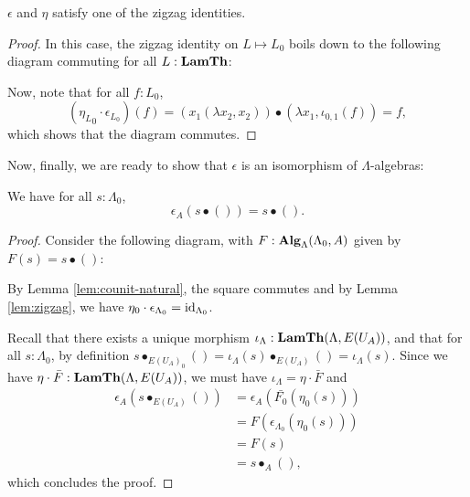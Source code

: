 \begin{lemma}\label{lem:zigzag}
  $ \epsilon $ and $ \eta $ satisfy one of the zigzag identities.
\end{lemma}
\begin{proof}
  In this case, the zigzag identity on $ L \mapsto L_0 $ boils down to the following diagram commuting for all $ L : \mathbf{LamTh} $:
  \begin{center}
  \end{center}
  Now, note that for all $ f : L_0 $,
  \[
    ({\eta_L}_0 \cdot \epsilon_{L_0})(f)
    = (x_1 (\lambda x_2, x_2)) \bullet (\lambda x_1, \iota_{0, 1}(f))
    = f,
  \]
  which shows that the diagram commutes.
\end{proof}

Now, finally, we are ready to show that $ \epsilon $ is an isomorphism of $ \Lambda $-algebras:
\begin{lemma}
  We have for all $ s: \Lambda_0 $,
  \[ \epsilon_A(s \bullet ()) = s \bullet (). \]
\end{lemma}
\begin{proof}
  Consider the following diagram, with $ F: \mathbf{Alg}_{\Lambda}(\Lambda_0, A) $ given by $ F(s) = s \bullet () $:
  \begin{center}
  \end{center}
  By Lemma \ref{lem:counit-natural}, the square commutes and by Lemma \ref{lem:zigzag}, we have $ \eta_0 \cdot \epsilon_{\Lambda_0} = \text{id}_{\Lambda_0} $.

  Recall that there exists a unique morphism $ \iota_\Lambda: \mathbf{LamTh}(\Lambda, E(U_A)) $, and that for all $ s: \Lambda_0 $, by definition $ s \bullet_{E(U_A)_0} () = \iota_\Lambda(s) \bullet_{E(U_A)} () = \iota_\Lambda(s) $. Since we have $ \eta \cdot \bar F : \mathbf{LamTh}(\Lambda, E(U_A)) $, we must have $ \iota_\Lambda = \eta \cdot \bar F $ and
  \begin{align*}
    \epsilon_A(s \bullet_{E(U_A)} ())
    &= \epsilon_A(\bar{F_0}(\eta_0(s)))\\
    &= F(\epsilon_{\Lambda_0}(\eta_0(s)))\\
    &= F(s)\\
    &= s \bullet_A (),
  \end{align*}
  which concludes the proof.
\end{proof}

